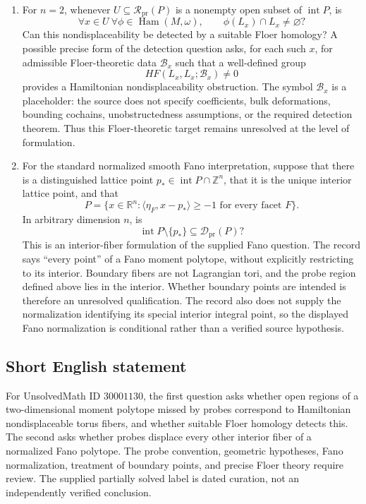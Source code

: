 \documentclass[11pt]{article}
\newcommand{\Z}{\mathbb{Z}}
\newcommand{\R}{\mathbb{R}}
\begin{document}
\begin{enumerate}
\item For \(n=2\), whenever \(U\subseteq\mathcal R_{\mathrm{pr}}(P)\) is a nonempty open subset of \(\operatorname{int}P\), is
\[
 \forall x\in U\ \forall\phi\in\operatorname{Ham}(M,\omega),
 \qquad \phi(L_x)\cap L_x\ne\varnothing?
\]
Can this nondisplaceability be detected by a suitable Floer homology? A possible precise form of the detection question asks, for each such \(x\), for admissible Floer-theoretic data \(\mathcal B_x\) such that a well-defined group
\[
 HF(L_x,L_x;\mathcal B_x)\ne0
\]
provides a Hamiltonian nondisplaceability obstruction. The symbol \(\mathcal B_x\) is a placeholder: the source does not specify coefficients, bulk deformations, bounding cochains, unobstructedness assumptions, or the required detection theorem. Thus this Floer-theoretic target remains unresolved at the level of formulation.

\item For the standard normalized smooth Fano interpretation, suppose that there is a distinguished lattice point \(p_*\in\operatorname{int}P\cap\Z^n\), that it is the unique interior lattice point, and that
\[
 P=\{x\in\R^n:\langle\eta_F,x-p_*\rangle\geq-1
                    \text{ for every facet }F\}.
\]
In arbitrary dimension \(n\), is
\[
 \operatorname{int}P\setminus\{p_*\}
 \subseteq\mathcal D_{\mathrm{pr}}(P)?
\]
This is an interior-fiber formulation of the supplied Fano question. The record says ``every point'' of a Fano moment polytope, without explicitly restricting to its interior. Boundary fibers are not Lagrangian tori, and the probe region defined above lies in the interior. Whether boundary points are intended is therefore an unresolved qualification. The record also does not supply the normalization identifying its special interior integral point, so the displayed Fano normalization is conditional rather than a verified source hypothesis.
\end{enumerate}
\subsection{Short English statement}
For UnsolvedMath ID \(30001130\), the first question asks whether open regions of a two-dimensional moment polytope missed by probes correspond to Hamiltonian nondisplaceable torus fibers, and whether suitable Floer homology detects this. The second asks whether probes displace every other interior fiber of a normalized Fano polytope. The probe convention, geometric hypotheses, Fano normalization, treatment of boundary points, and precise Floer theory require review. The supplied partially solved label is dated curation, not an independently verified conclusion.
\end{document}
